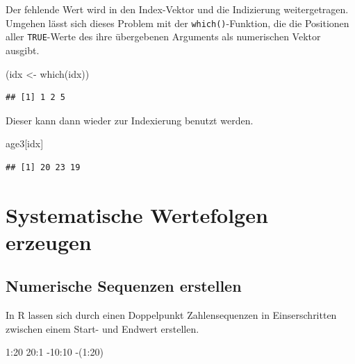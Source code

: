 \documentclass[
]{book}
\newenvironment{Shaded}{\begin{snugshade}}{\end{snugshade}}
\newcommand{\DecValTok}[1]{\textcolor[rgb]{0.00,0.00,0.81}{#1}}
\newcommand{\FunctionTok}[1]{\textcolor[rgb]{0.00,0.00,0.00}{#1}}
\newcommand{\NormalTok}[1]{#1}
\newcommand{\OtherTok}[1]{\textcolor[rgb]{0.56,0.35,0.01}{#1}}
\newcommand{\SpecialCharTok}[1]{\textcolor[rgb]{0.00,0.00,0.00}{#1}}
\begin{document}
Der fehlende Wert wird in den Index-Vektor und die Indizierung weitergetragen.\\
Umgehen lässt sich dieses Problem mit der \texttt{which()}-Funktion, die die Positionen aller \texttt{TRUE}-Werte des ihre übergebenen Arguments als numerischen Vektor ausgibt.

\begin{Shaded}
\begin{Highlighting}[]
\NormalTok{(idx }\OtherTok{\textless{}{-}} \FunctionTok{which}\NormalTok{(idx))}
\end{Highlighting}
\end{Shaded}

\begin{verbatim}
## [1] 1 2 5
\end{verbatim}

Dieser kann dann wieder zur Indexierung benutzt werden.

\begin{Shaded}
\begin{Highlighting}[]
\NormalTok{age3[idx]}
\end{Highlighting}
\end{Shaded}

\begin{verbatim}
## [1] 20 23 19
\end{verbatim}

\hypertarget{systematische-wertefolgen-erzeugen}{%
\section{Systematische Wertefolgen erzeugen}\label{systematische-wertefolgen-erzeugen}}

\hypertarget{numerische-sequenzen-erstellen}{%
\subsection{Numerische Sequenzen erstellen}\label{numerische-sequenzen-erstellen}}

\small

In R lassen sich durch einen Doppelpunkt Zahlensequenzen in Einserschritten zwischen einem Start- und Endwert erstellen.

\begin{Shaded}
\begin{Highlighting}[]
\DecValTok{1}\SpecialCharTok{:}\DecValTok{20} 
\DecValTok{20}\SpecialCharTok{:}\DecValTok{1}
\SpecialCharTok{{-}}\DecValTok{10}\SpecialCharTok{:}\DecValTok{10}
\SpecialCharTok{{-}}\NormalTok{(}\DecValTok{1}\SpecialCharTok{:}\DecValTok{20}\NormalTok{)}
\end{Highlighting}
\end{Shaded}
\end{document}
